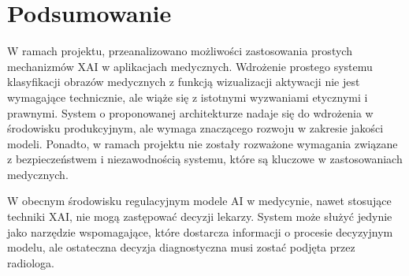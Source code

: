\documentclass{article}
\begin{document}
\section{Podsumowanie}

W ramach projektu, przeanalizowano możliwości zastosowania prostych mechanizmów XAI w aplikacjach medycznych.
Wdrożenie prostego systemu klasyfikacji obrazów medycznych z funkcją wizualizacji aktywacji nie jest wymagające technicznie, ale wiąże się z istotnymi wyzwaniami etycznymi i prawnymi.
System o proponowanej architekturze nadaje się do wdrożenia w środowisku produkcyjnym, ale wymaga znaczącego rozwoju w zakresie jakości modeli.
Ponadto, w ramach projektu nie zostały rozważone wymagania związane z bezpieczeństwem i niezawodnością systemu, które są kluczowe w zastosowaniach medycznych.

W obecnym środowisku regulacyjnym modele AI w medycynie, nawet stosujące techniki XAI, nie mogą zastępować decyzji lekarzy.
System może służyć jedynie jako narzędzie wspomagające, które dostarcza informacji o procesie decyzyjnym modelu, ale ostateczna decyzja diagnostyczna musi zostać podjęta przez radiologa.

\newpage
\printbibliography
\end{document}
